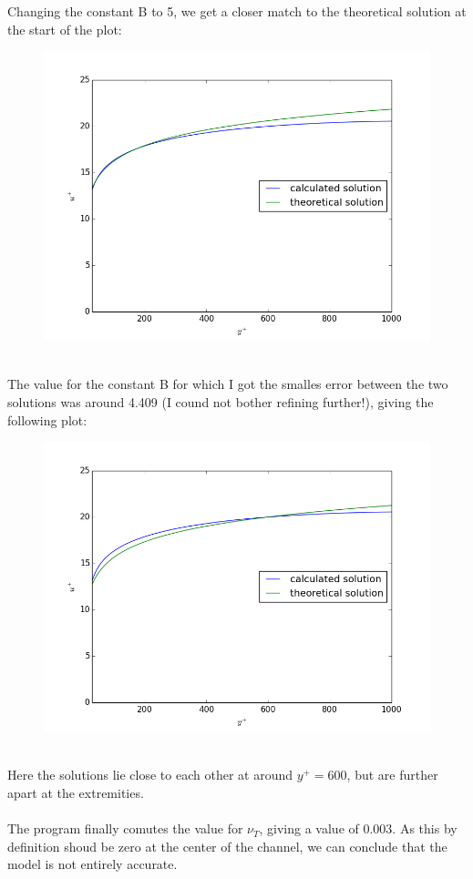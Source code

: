 \documentclass[a4paper,english,11pt,twoside]{article}
\begin{document}
Changing the constant B to 5, we get a closer match to the theoretical solution at the start of the plot:
\begin{figure}[h!]
\includegraphics[scale=0.6]{3b_figure_3.png}
\end{figure}\\

\newpage
The value for the constant B for which I got the smalles error between the two solutions was around 4.409 (I cound not bother refining further!), giving the following plot:
\begin{figure}[h!]
\includegraphics[scale=0.7]{3b_figure_4.png}
\end{figure}\\
Here the solutions lie close to each other at around $y^+ = 600$, but are further apart at the extremities.\\
\\
The program finally comutes the value for $\nu_T$, giving a value of 0.003. As this by definition shoud be zero at the center of the channel, we can conclude that the model is not entirely accurate.
\end{document}
